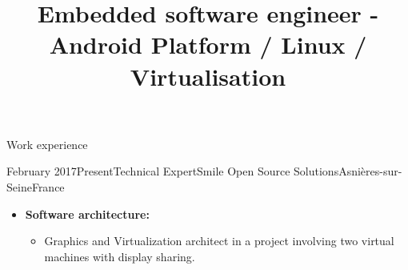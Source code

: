 \documentclass[a4paper, 10pt]{article}
\begin{document}




\begin {identity}
    \name {\personalFirstName}{\personalLastName}
\end {identity}

\title {Embedded software engineer - Android Platform / Linux / Virtualisation}

\begin{section} {Work experience}
    \begin{experience}{February 2017}{Present}{Technical Expert}{Smile Open Source Solutions}{Asni\`{e}res-sur-Seine}{France}
    \begin{subexperience}
    \begin{itemize}[parsep=0cm,itemsep=0cm,topsep=0cm]
		\item \textbf {Software architecture:}
		\begin{itemize}[parsep=0cm,itemsep=0cm,topsep=0cm]
		\item Graphics and Virtualization architect in a project involving two virtual machines with display sharing.
		\end{itemize}
	\end{itemize}
	\end{subexperience}
	\end{experience}


\end{section}
\end{document}
